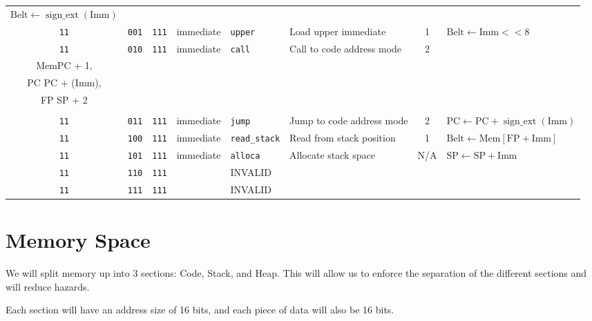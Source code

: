 \documentclass{article}
\begin{document}
\begin{landscape}
\begin{longtable}{c c c c l l c l}
			\(\textrm{Belt} \gets \operatorname{sign\_ext}\left(\textrm{Imm}\right)\) \\
		\texttt{11} & \texttt{001} & \texttt{111} & immediate & \texttt{upper}       & Load upper immediate      & 1   &
			\(\textrm{Belt} \gets \textrm{Imm} << 8\) \\
		\texttt{11} & \texttt{010} & \texttt{111} & immediate & \texttt{call}        & Call to code address mode & 2 &
			\(\begin{array}{l}
				\textrm{Mem}\left[\textrm{SP}\right] \gets \textrm{FP}, \\
				\textrm{Mem}\left[\textrm{SP} + 1\right] \gets \textrm{PC} + 1, \\
				\textrm{PC} \gets \textrm{PC} + \operatorname{sign\_ext}\left(\textrm{Imm}\right), \\
				\textrm{FP} \gets \textrm{SP} + 2 \\
			\end{array}\) \\
		\texttt{11} & \texttt{011} & \texttt{111} & immediate & \texttt{jump}        & Jump to code address mode & 2 &
			\(\textrm{PC} \gets \textrm{PC} + \operatorname{sign\_ext}\left(\textrm{Imm}\right)\) \\
		\texttt{11} & \texttt{100} & \texttt{111} & immediate & \texttt{read\_stack} & Read from stack position  & 1   &
			\(\textrm{Belt} \gets \textrm{Mem}\left[\textrm{FP} + \textrm{Imm}\right]\) \\
		\texttt{11} & \texttt{101} & \texttt{111} & immediate & \texttt{alloca}      & Allocate stack space      & N/A &
			\(\textrm{SP} \gets \textrm{SP} + \textrm{Imm}\) \\
		\texttt{11} & \texttt{110} & \texttt{111} & & INVALID & \\
		\texttt{11} & \texttt{111} & \texttt{111} & & INVALID & \\
	\end{longtable}
\end{landscape}

\section{Memory Space}

	We will split memory up into 3 sections: Code, Stack, and Heap.
	This will allow us to enforce the separation of the different sections and will reduce hazards.

	Each section will have an address size of 16 bits, and each piece of data will also be 16 bits.
\end{document}
